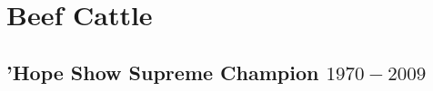 \chapter{Beef Cattle}
\section[Supreme Champion]{'Hope Show Supreme Champion $1970 - 2009$}
\small

\normalsize
